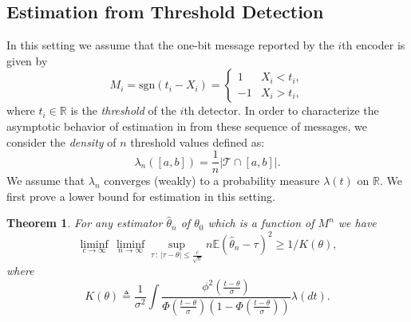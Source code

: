\documentclass[letterpaper, conference]{IEEEtran}      %
\newtheorem{thm}{\bf{Theorem}}
\newcommand{\sgn}{\mathrm{sgn} }
\begin{document}


\subsection{Estimation from Threshold Detection}
In this setting we assume that the one-bit message reported by the $i$th encoder is given by 
\[
M_i = \sgn(t_i - X_i) = \begin{cases} 1 & X_i< t_i, \\
-1 & X_i > t_i,
\end{cases}  
\]
where $t_i\in\mathbb R$ is the \emph{threshold} of the $i$th detector.  In order to characterize the asymptotic behavior of estimation in from these sequence of messages, we consider the \emph{density} of $n$ threshold values defined as:
\[
\lambda_n([a,b]) = \frac{1}{n} \left| \mathcal T \cap [a,b] \right|.
\]
We assume that $\lambda_n$ converges (weakly) to a probability measure $\lambda(t)$ on $\mathbb R$. We first prove a lower bound for estimation in this setting.
\begin{thm} \label{thm:LAN}
For any estimator $\widehat{\theta}_n$ of $\theta_0$ which is a function of $M^n$ we have
\[
\liminf_{c\rightarrow \infty}\, \liminf_{n\rightarrow \infty} \sup_{\tau\,:\,| \tau - \theta| \leq \frac{c}{\sqrt{n}} }  n \mathbb E \left(\widehat{\theta}_n - \tau \right)^2 \geq 1/K(\theta),
\]
where 
\[
K(\theta) \triangleq  \frac{1}{\sigma^2}\int \frac{ \phi^2\left( \frac{t - \theta }{\sigma} \right)}{ \Phi\left(\frac{t- \theta}{\sigma}\right) \left(1-\Phi\left( \frac{t-\theta}{\sigma} \right) \right)} \lambda(dt).
\]
\end{thm}
\end{document}
